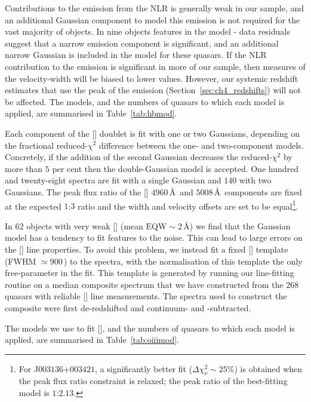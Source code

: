 Contributions to the \hb emission from the NLR is generally weak in our sample, and an additional Gaussian component to model this emission is not required for the vast majority of objects. 
In nine objects features in the model - data residuals suggest that a narrow emission component is significant, and an additional narrow Gaussian is included in the model for these quasars. 
If the NLR contribution to the \hb emission is significant in more of our sample, then measures of the \hb velocity-width will be biased to lower values. 
However, our systemic redshift estimates that use the peak of the \hb emission (Section~\ref{sec:ch4_redshifts}) will not be affected. 
The \hb models, and the numbers of quasars to which each model is applied, are summarised in Table~\ref{tab:hbmod}. 

Each component of the [] doublet is fit with one or two Gaussians, depending on the fractional reduced-$\chi^2$ difference between the one- and two-component models. 
Concretely, if the addition of the second Gaussian decreases the reduced-$\chi^2$ by more than $5$ per cent then the double-Gaussian model is accepted.
One hundred and twenty-eight spectra are fit with a single Gaussian and $140$ with two Gaussians. 
The peak flux ratio of the [] $4960$\,\AA\, and $5008$\,\AA\, components are fixed at the expected $1$:$3$ ratio and the width and velocity offsets are set to be equal\footnote{For J$003136$+$003421$, a significantly better fit ($\Delta \chi^2_{\nu} \sim 25\%$) is obtained when the peak flux ratio constraint is relaxed; the peak ratio of the best-fitting model is $1$:$2.13$.}.

In $62$ objects with very weak [] (mean $\text{EQW}\sim2$\,\AA) we find that the Gaussian model has a tendency to fit features to the noise. 
This can lead to large errors on the [] line properties. 
To avoid this problem, we instead fit a fixed [] template (FWHM $\simeq900$\,\kms) to the spectra, with the normalisation of this template the only free-parameter in the fit.
This template is generated by running our line-fitting routine on a median composite spectrum that we have constructed from the $268$ quasars with reliable [] line measurements.  
The spectra used to construct the composite were first de-redshifted and continuum- and -subtracted.

The models we use to fit [], and the numbers of quasars to which each model is applied, are summarised in Table~\ref{tab:oiiimod}.

